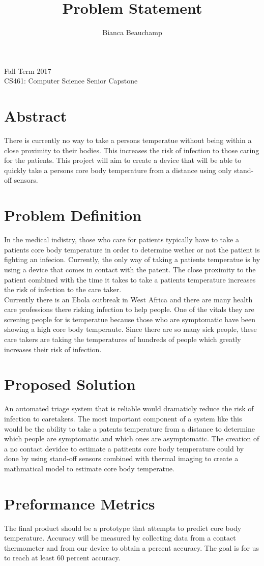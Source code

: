 \documentclass[10pt]{IEEEtran}
\begin{document}
\begin{titlepage}
\title{Problem Statement}
\author{Bianca Beauchamp}
\maketitle
\centering
Fall Term 2017\\CS461: Computer Science Senior Capstone
\section{Abstract}
There is currently no way to take a persons temperatue without being within a close proximity to their bodies. This increases the risk of infection to those caring for the patients. This project will aim to create a device that will be able to quickly take a persons core body temperature from a distance using only stand-off sensors.
\end{titlepage}

\section{Problem Definition}
In the medical indistry, those who care for patients typically have to take a patients core body temperature in order to determine wether or not the patient is fighting an infecion. Currently, the only way of taking a patients temperatue is by using a device that comes in contact with the patent. The close proximity to the patient combined with the time it takes to take a patients temperature increases the risk of infection to the care taker.\\
Currently there is an Ebola outbreak in West Africa and there are many health care professions there risking infection to help people. One of the vitals they are screning people for is temperatue because those who are symptomatic have been showing a high core body temperaute. Since there are so many sick people, these care takers are taking the temperatures of hundreds of people which greatly increases their risk of infection. 

\section{Proposed Solution}
 An automated triage system that is reliable would dramaticly reduce the risk of infection to caretakers. The most important component of a system like this would be the ability to take a patents temperature from a distance to determine which people are symptomatic and which ones are asymptomatic. The creation of a no contact devidce to estimate a patitents core body temperature could by done by using stand-off sensors combined with thermal imaging to create a mathmatical model to estimate core body temperatue.

\section{Preformance Metrics}

The final product should be a prototype that attempts to predict core body temperature. Accuracy will be measured by collecting data from a contact thermometer and from our device to obtain a percent accuracy. The goal is for us to reach at least 60 percent accuracy.
\end{document}
